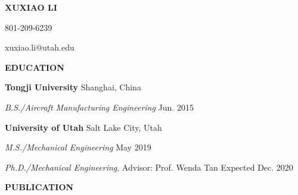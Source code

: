 \documentclass[11pt, letterpaper]{article}
\begin{document}
\begin{center}
   \textbf{\Large XUXIAO LI}

   \large 801-209-6239

   \large xuxiao.li@utah.edu
   \paraspace
\end{center}

\textbf{EDUCATION}

\fullrule
\vspace{6pt}

\textbf{Tongji University} 
\hfill
Shanghai, China

\textit{B.S./Aircraft Manufacturing Engineering} \hfill Jun. 2015

\vspace{6pt}
\textbf{University of Utah} \hfill Salt Lake City, Utah

\textit{M.S./Mechanical Engineering} \hfill May 2019

\textit{Ph.D./Mechanical Engineering}, Advisor: Prof. Wenda Tan \hfill Expected Dec. 2020
\paraspace

\textbf{PUBLICATION}

\fullrule
\vspace{6pt}
\end{document}

